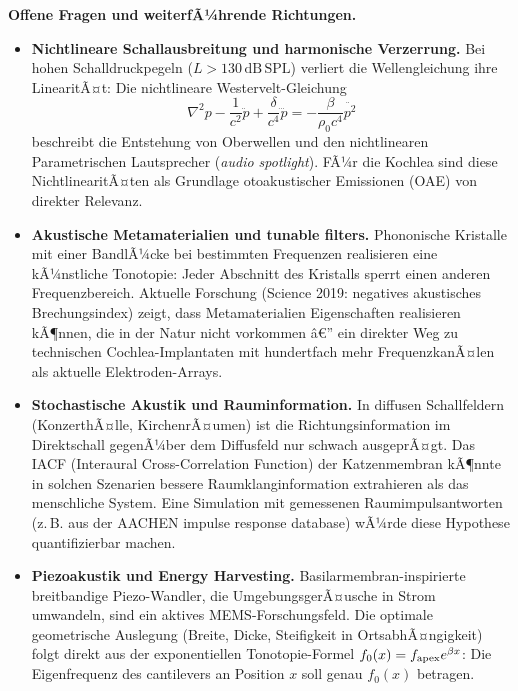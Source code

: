 ﻿\documentclass[12pt,a4paper,titlepage]{report}
\begin{document}
\textbf{Offene Fragen und weiterfÃ¼hrende Richtungen.}
\begin{itemize}[leftmargin=2em]
  \item \textbf{Nichtlineare Schallausbreitung und harmonische Verzerrung.}
    Bei hohen Schalldruckpegeln ($L > 130\,\mathrm{dB}\,\mathrm{SPL}$)
    verliert die Wellengleichung ihre LinearitÃ¤t:
    Die nichtlineare Westervelt-Gleichung
    \[
      \nabla^2 p - \frac{1}{c^2}\ddot{p}
      + \frac{\delta}{c^4}\dddot{p}
      = -\frac{\beta}{\rho_0 c^4}\ddot{p^2}
    \]
    beschreibt die Entstehung von Oberwellen und den nichtlinearen
    Parametrischen Lautsprecher (\emph{audio spotlight}).
    FÃ¼r die Kochlea sind diese NichtlinearitÃ¤ten als Grundlage
    otoakustischer Emissionen (OAE) von direkter Relevanz.
  \item \textbf{Akustische Metamaterialien und tunable filters.}
    Phononische Kristalle mit einer BandlÃ¼cke bei bestimmten
    Frequenzen realisieren eine kÃ¼nstliche Tonotopie:
    Jeder Abschnitt des Kristalls sperrt einen anderen
    Frequenzbereich.
    Aktuelle Forschung (Science 2019: negatives akustisches Brechungsindex)
    zeigt, dass Metamaterialien Eigenschaften realisieren kÃ¶nnen,
    die in der Natur nicht vorkommen â€”
    ein direkter Weg zu technischen Cochlea-Implantaten
    mit hundertfach mehr FrequenzkanÃ¤len als aktuelle Elektroden-Arrays.
  \item \textbf{Stochastische Akustik und Rauminformation.}
    In diffusen Schallfeldern (KonzerthÃ¤lle, KirchenrÃ¤umen) ist
    die Richtungsinformation im Direktschall gegenÃ¼ber dem
    Diffusfeld nur schwach ausgeprÃ¤gt.
    Das IACF (Interaural Cross-Correlation Function) der
    Katzenmembran kÃ¶nnte in solchen Szenarien bessere
    Raumklanginformation extrahieren als das menschliche System.
    Eine Simulation mit gemessenen Raumimpulsantworten
    (z.\,B. aus der AACHEN impulse response database)
    wÃ¼rde diese Hypothese quantifizierbar machen.
  \item \textbf{Piezoakustik und Energy Harvesting.}
    Basilarmembran-inspirierte breitbandige Piezo-Wandler,
    die UmgebungsgerÃ¤usche in Strom umwandeln, sind ein
    aktives MEMS-Forschungsfeld.
    Die optimale geometrische Auslegung (Breite, Dicke, Steifigkeit
    in OrtsabhÃ¤ngigkeit)  folgt direkt aus der exponentiellen
    Tonotopie-Formel $f_0(x) = f_{\rm apex} e^{\beta x}$:
    Die Eigenfrequenz des cantilevers an Position $x$
    soll genau $f_0(x)$ betragen.
\end{itemize}
\end{document}

